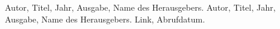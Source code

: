 \renewcommand{\refname}{Quellen}
\begin{thebibliography}{9}
     Autor, Titel, Jahr, Ausgabe, Name des Herausgebers.
     Autor, Titel, Jahr, Ausgabe, Name des Herausgebers.
     Link, Abrufdatum.
\end{thebibliography}

\newpage